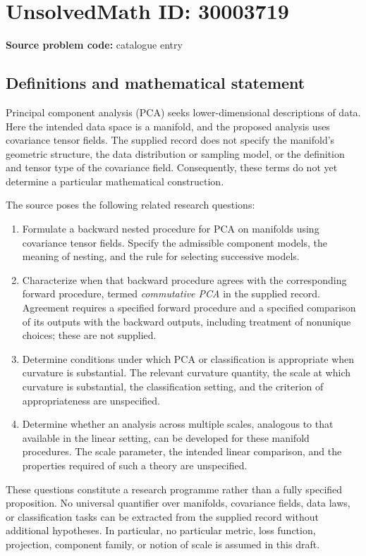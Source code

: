 \documentclass[11pt]{article}
\begin{document}
\section*{UnsolvedMath ID: 30003719}
\textbf{Source problem code:} catalogue entry
\subsection{Definitions and mathematical statement}
Principal component analysis (PCA) seeks lower-dimensional descriptions of data. Here the intended data space is a manifold, and the proposed analysis uses covariance tensor fields. The supplied record does not specify the manifold's geometric structure, the data distribution or sampling model, or the definition and tensor type of the covariance field. Consequently, these terms do not yet determine a particular mathematical construction.

The source poses the following related research questions:
\begin{enumerate}
\item Formulate a backward nested procedure for PCA on manifolds using covariance tensor fields. Specify the admissible component models, the meaning of nesting, and the rule for selecting successive models.
\item Characterize when that backward procedure agrees with the corresponding forward procedure, termed \emph{commutative PCA} in the supplied record. Agreement requires a specified forward procedure and a specified comparison of its outputs with the backward outputs, including treatment of nonunique choices; these are not supplied.
\item Determine conditions under which PCA or classification is appropriate when curvature is substantial. The relevant curvature quantity, the scale at which curvature is substantial, the classification setting, and the criterion of appropriateness are unspecified.
\item Determine whether an analysis across multiple scales, analogous to that available in the linear setting, can be developed for these manifold procedures. The scale parameter, the intended linear comparison, and the properties required of such a theory are unspecified.
\end{enumerate}
These questions constitute a research programme rather than a fully specified proposition. No universal quantifier over manifolds, covariance fields, data laws, or classification tasks can be extracted from the supplied record without additional hypotheses. In particular, no particular metric, loss function, projection, component family, or notion of scale is assumed in this draft.
\end{document}
